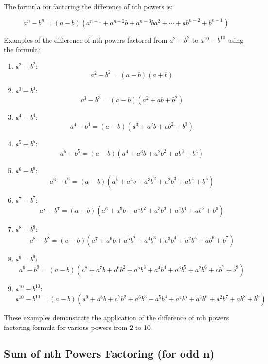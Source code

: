\documentclass{article}
\begin{document}
The formula for factoring the difference of nth powers is:

\[
a^n - b^n = (a - b)(a^{n-1} + a^{n-2}b + a^{n-3}ba^2 + \cdots + ab^{n-2} + b^{n-1})
\]

Examples of the difference of nth powers factored from \(a^2 - b^2\) to \(a^{10} - b^{10}\) using the formula:

\begin{enumerate}
    \item \(a^2 - b^2\):
    \[
    a^2 - b^2 = (a - b)(a + b)
    \]
    
    \item \(a^3 - b^3\):
    \[
    a^3 - b^3 = (a - b)(a^2 + ab + b^2)
    \]
    
    \item \(a^4 - b^4\):
    \[
    a^4 - b^4 = (a - b)(a^3 + a^2b + ab^2 + b^3)
    \]
    
    \item \(a^5 - b^5\):
    \[
    a^5 - b^5 = (a - b)(a^4 + a^3b + a^2b^2 + ab^3 + b^4)
    \]
    
    \item \(a^6 - b^6\):
    \[
    a^6 - b^6 = (a - b)(a^5 + a^4b + a^3b^2 + a^2b^3 + ab^4 + b^5)
    \]
    
    \item \(a^7 - b^7\):
    \[
    a^7 - b^7 = (a - b)(a^6 + a^5b + a^4b^2 + a^3b^3 + a^2b^4 + ab^5 + b^6)
    \]
    
    \item \(a^8 - b^8\):
    \[
    a^8 - b^8 = (a - b)(a^7 + a^6b + a^5b^2 + a^4b^3 + a^3b^4 + a^2b^5 + ab^6 + b^7)
    \]
    
    \item \(a^9 - b^9\):
    \[
    a^9 - b^9 = (a - b)(a^8 + a^7b + a^6b^2 + a^5b^3 + a^4b^4 + a^3b^5 + a^2b^6 + ab^7 + b^8)
    \]
    
    \item \(a^{10} - b^{10}\):
    \[
    a^{10} - b^{10} = (a - b)(a^9 + a^8b + a^7b^2 + a^6b^3 + a^5b^4 + a^4b^5 + a^3b^6 + a^2b^7 + ab^8 + b^9)
    \]
\end{enumerate}

These examples demonstrate the application of the difference of nth powers factoring formula for various powers from 2 to 10.

\subsection*{Sum of nth Powers Factoring (for odd n)}
\end{document}
